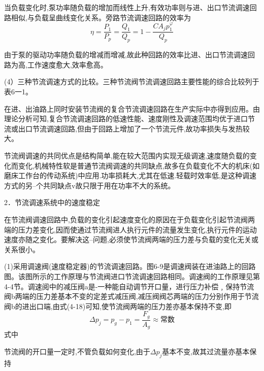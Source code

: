 当负载变化时,泵功率随负载的增加而线性上升,有效功率则与进、出口节流调速回路相似,与负载呈曲线变化关系。旁路节流调速回路的效率为
$$
\eta =\frac{P_1}{P_p}=\frac{Q_1}{Q_p}=1-\frac{CA_jp_{1}^{\varphi}}{Q_p}
$$

由于泵的驱动功率随负载的增减而增减,故此种回路的效率比进、出口节流调速回路为高,工作速度愈大,效率愈高。

(4）三种节流调速方式的比较。三种节流阀节流调速回路主要性能的综合比较列于表6一1。

在进、出油路上同时安装节流阀的复合节流调速回路在生产实际中亦得到应用。由理论分析可知,复合节流调速回路的低速性能、速度刚性及调速范围均优于进口节流或出口节流调速回路,但由于回路上增加了一个节流元件,故功率损失与发热较大。

节流阀调速的共同优点是结构简单,能在较大范围内实现无级调速,速度随负载的变化而变化,机械特性软是普通节流阀调速的共同缺点,故多在负载变化不大的机床(如磨床工作台的传动系统)中应用.功率损耗大,尤其在低速.轻载时效率低,是这种调速方式的另--个共同缺点v故只限于用在功率不大的系统。

2．节流调速系统中的速度稳定

在节流阀调速回路中,负载的变化引起速度变化的原因在于负载变化引起节流阀两端的压力差变化,因而使通过节流阀进人执行元件的流量发生变化,执行元件的运动速度亦随之变化。要解决这--问题,必须使节流阀两端的压力差与负载的变化无关或关系很小。

(1)采用调速阀(速度稳定器)的节流调速回路。图6-9是调速阀装在进油路上的回路图。该图所示的工作原理与节流阀进口节流调速回路相同。调速阀的工作原理见第4-4节。调速阅中的减压阀a是-一种能自动调节开口量，进行压力补偿﹐保持节流阀b两端的压力差基本不变的定差式减压阀,减压阀阀芯两端的压力分别作用于节流阀b的进出口端,由式(4-18)可知,使节流阀两端的压力差亦基本保持不变,即
$$
\varDelta p_j=p_g-p_1=\frac{F_g}{A_g}\approx \text{常数}
$$
式中 \quad
{}

节流阀的开口量一定时,不管负载如何变化,由于$\varDelta p_j$基本不变,故其过流量亦基本保持
